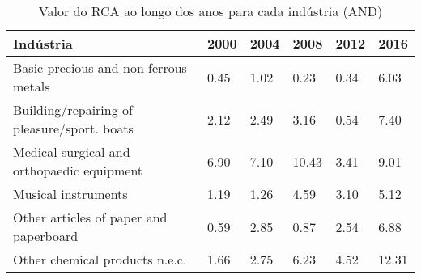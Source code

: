 \begin{table}
\centering
\caption{Valor do RCA ao longo dos anos para cada indústria (AND)}
\label{tab:ex3-tempo-AND}
\begin{tabular}{p{6cm}p{1.5cm}p{1.5cm}p{1.5cm}p{1.5cm}p{1.5cm}}
\toprule
                                  Indústria & 2000 & 2004 &  2008 & 2012 &  2016 \\
\midrule
      Basic precious and non-ferrous metals & 0.45 & 1.02 &  0.23 & 0.34 &  6.03 \\
Building/repairing of pleasure/sport. boats & 2.12 & 2.49 &  3.16 & 0.54 &  7.40 \\
 Medical surgical and orthopaedic equipment & 6.90 & 7.10 & 10.43 & 3.41 &  9.01 \\
                        Musical instruments & 1.19 & 1.26 &  4.59 & 3.10 &  5.12 \\
     Other articles of paper and paperboard & 0.59 & 2.85 &  0.87 & 2.54 &  6.88 \\
             Other chemical products n.e.c. & 1.66 & 2.75 &  6.23 & 4.52 & 12.31 \\
\bottomrule
\end{tabular}
\end{table}
